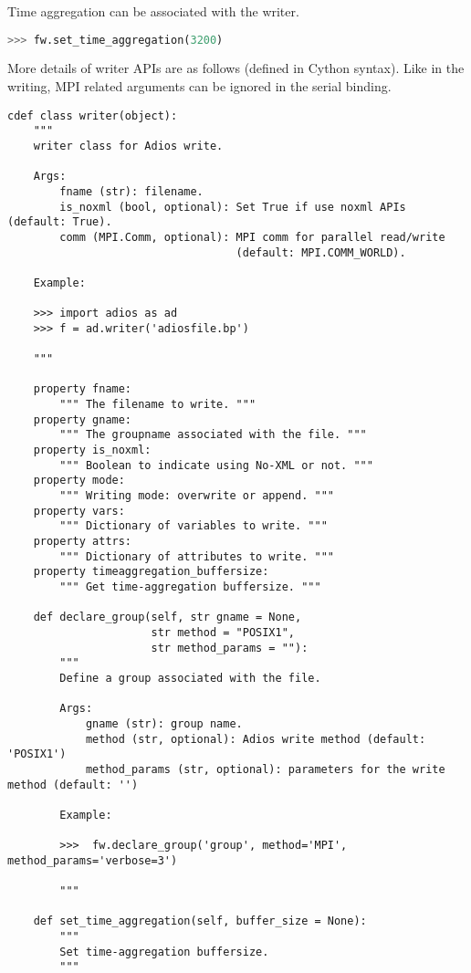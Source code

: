 Time aggregation can be associated with the writer.
\begin{lstlisting}[language=Python,caption={An example of time aggregation method},label={},]
>>> fw.set_time_aggregation(3200)
\end{lstlisting}

More details of writer APIs are as follows (defined in Cython syntax). Like in the writing, MPI related arguments can be ignored in the serial binding.

\begin{lstlisting}[language=cython,caption={Writer functions},label={},]
cdef class writer(object):
    """
    writer class for Adios write.

    Args:
        fname (str): filename.
        is_noxml (bool, optional): Set True if use noxml APIs (default: True).
        comm (MPI.Comm, optional): MPI comm for parallel read/write 
                                   (default: MPI.COMM_WORLD).

    Example:

    >>> import adios as ad
    >>> f = ad.writer('adiosfile.bp')

    """

    property fname:
        """ The filename to write. """
    property gname:
        """ The groupname associated with the file. """
    property is_noxml:
        """ Boolean to indicate using No-XML or not. """
    property mode:
        """ Writing mode: overwrite or append. """
    property vars:
        """ Dictionary of variables to write. """
    property attrs:
        """ Dictionary of attributes to write. """
    property timeaggregation_buffersize:
        """ Get time-aggregation buffersize. """

    def declare_group(self, str gname = None,
                      str method = "POSIX1",
                      str method_params = ""):
        """
        Define a group associated with the file.

        Args:
            gname (str): group name.
            method (str, optional): Adios write method (default: 'POSIX1')
            method_params (str, optional): parameters for the write method (default: '')

        Example:

        >>>  fw.declare_group('group', method='MPI', method_params='verbose=3')

        """

    def set_time_aggregation(self, buffer_size = None):
        """
        Set time-aggregation buffersize.
        """


\end{lstlisting}
